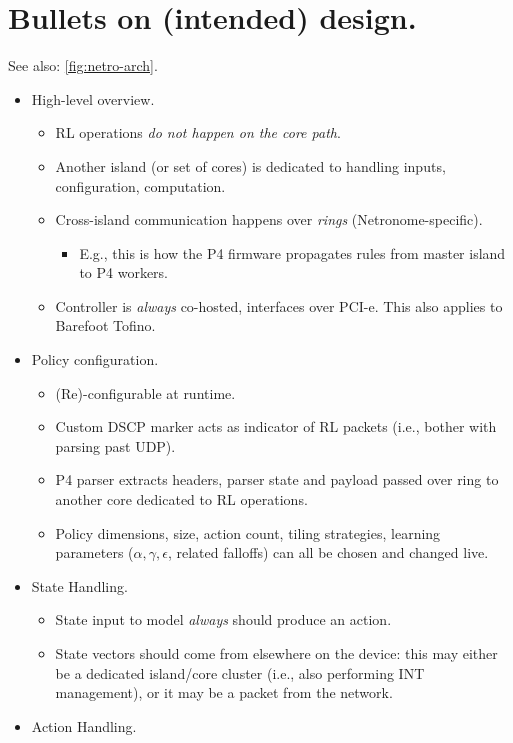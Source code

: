 \documentclass[sigconf,natbib=false]{acmart}
\begin{document}
\section{Bullets on (intended) design.}
See also: \cref{fig:netro-arch}.
\begin{itemize}
	\item High-level overview.
	\begin{itemize}
		\item RL operations \emph{do not happen on the core path}.
		\item Another island (or set of cores) is dedicated to handling inputs, configuration, computation.
		\item Cross-island communication happens over \emph{rings} (Netronome-specific).
		\begin{itemize}
			\item E.g., this is how the P4 firmware propagates rules from master island to P4 workers.
		\end{itemize}
		\item Controller is \emph{always} co-hosted, interfaces over PCI-e. This also applies to Barefoot Tofino.
	\end{itemize}
	\item Policy configuration.
	\begin{itemize}
		\item (Re)-configurable at runtime.
		\item Custom DSCP marker acts as indicator of RL packets (i.e., bother with parsing past UDP).
		\item P4 parser extracts headers, parser state and payload passed over ring to another core dedicated to RL operations.
		\item Policy dimensions, size, action count, tiling strategies, learning parameters ($\alpha, \gamma, \epsilon$, related falloffs) can all be chosen and changed live.
	\end{itemize}
	\item State Handling.
	\begin{itemize}
		\item State input to model \emph{always} should produce an action.
		\item State vectors should come from elsewhere on the device: this may either be a dedicated island/core cluster (i.e., also performing INT management), or it may be a packet from the network.
	\end{itemize}
	\item Action Handling.
	\begin{itemize}

\end{itemize}
\end{itemize}
\end{document}

